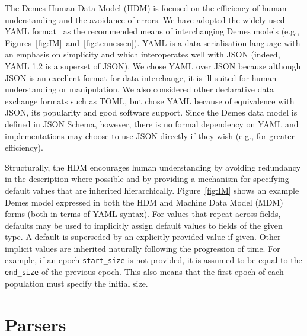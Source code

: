 \documentclass[11pt]{article}
\begin{document}
The Demes Human Data Model (HDM) is focused on the efficiency of
human understanding and the avoidance of errors. We have adopted the widely
used YAML format~\citep{ben2009yaml} as the recommended means of interchanging
Demes models (e.g., Figures~\ref{fig:IM}~and~\ref{fig:tennessen}). YAML is a data
serialisation language with an emphasis on simplicity and which interoperates well
with JSON (indeed, YAML 1.2 is a superset of JSON). We chose YAML over JSON
because although JSON is an excellent format for data interchange, it is
ill-suited for human understanding or manipulation. We also considered other
declarative data exchange formats such as TOML,
but chose YAML because of equivalence with JSON,
its popularity and good software support.
Since the Demes data model is defined in JSON Schema,
however, there is no formal dependency on YAML and implementations may choose
to use JSON directly if they wish (e.g., for greater efficiency).

Structurally, the HDM encourages human understanding
by avoiding redundancy in the description where possible and by providing a
mechanism for specifying default values that are inherited hierarchically.
Figure~\ref{fig:IM} shows an example Demes model expressed in both the
HDM and Machine Data Model (MDM) forms (both in terms of YAML syntax).
For values that repeat
across fields, defaults may be used to implicitly assign default values to
fields of the given type.  A default is superseded by an explicitly provided
value if given. Other implicit values are inherited naturally following the
progression of time. For example, if an epoch \texttt{start\_size} is not
provided, it is assumed to be equal to the \texttt{end\_size} of the previous
epoch. This also means that the first epoch of each population must specify the
initial size.

\section{Parsers}\label{sec:appendix-parsers}
\end{document}
